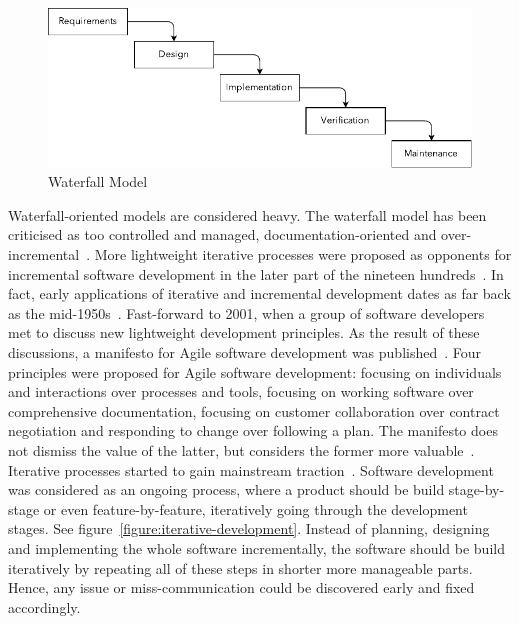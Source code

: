 \documentclass[english]{tktltiki2}
\begin{document}
\begin{figure}[h!]

    \vspace{1cm}
    \centering

    \includegraphics{waterfall-model}

    \caption{Waterfall Model}
    \label{figure:waterfall-model}

    \vspace{1cm}

\end{figure}

Waterfall-oriented models are considered heavy. The waterfall model has been criticised as too controlled and managed, documentation-oriented and over-incremental~\cite{Boe88, LB03}. More lightweight iterative processes were proposed as opponents for incremental software development in the later part of the nineteen hundreds~\cite{LB03}. In fact, early applications of iterative and incremental development dates as far back as the mid-1950s~\cite{LB03}. Fast-forward to 2001, when a group of software developers met to discuss new lightweight development principles. As the result of these discussions, a manifesto for Agile software development was published~\cite{BBB01a}. Four principles were proposed for Agile software development: focusing on individuals and interactions over processes and tools, focusing on working software over comprehensive documentation, focusing on customer collaboration over contract negotiation and responding to change over following a plan. The manifesto does not dismiss the value of the latter, but considers the former more valuable~\cite{BBB01a}. Iterative processes started to gain mainstream traction~\cite{LB03}. Software development was considered as an ongoing process, where a product should be build stage-by-stage or even feature-by-feature, iteratively going through the development stages. See figure~\ref{figure:iterative-development}. Instead of planning, designing and implementing the whole software incrementally, the software should be build iteratively by repeating all of these steps in shorter more manageable parts. Hence, any issue or miss-communication could be discovered early and fixed accordingly.
\end{document}
